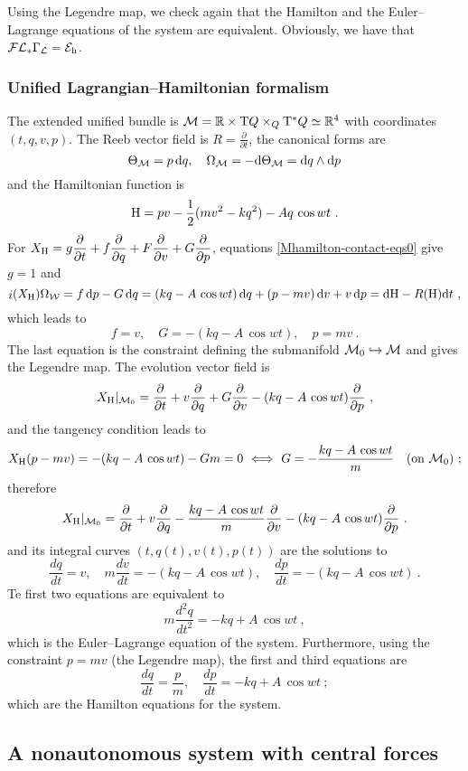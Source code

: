 \documentclass[12pt]{report}
\def\dst{\displaystyle}
\def\derpar#1#2{\frac{\partial{#1}}{\partial{#2}}}
\def\Lag{{\cal L}}
\def\d{{\rm d}}
\def\Real{\mathbb{R}}
\def\Tan{{\rm T}}
\def\inn{\mathop{i}\nolimits}
\def\Leg{{\cal F}\Lag}
\begin{document}
Using the Legendre map, we check again that the Hamilton and
the Euler--Lagrange equations of the system are equivalent.
Obviously, we have that $\Leg_*\Gamma_\Lag={\cal E}_{\rm h}$.


\subsubsection{Unified Lagrangian--Hamiltonian formalism}


The extended unified bundle is ${\cal M}=\Real\times\Tan Q\times_Q\Tan^*Q\simeq\Real^4$
with coordinates $(t,q,v,p)$. The Reeb vector field is $\dst R=\derpar{}{t}$, 
the canonical forms are
$$
\Theta_{\cal M}=p\,\d q ,\quad
\Omega_{\cal M}=-\d\Theta_{\cal M}=\d q\wedge\d p
$$
and the Hamiltonian function is
$$
{\rm H}=pv-\frac{1}{2}(mv^2-kq^2)-Aq\,\cos w t  \ .
$$
For $\displaystyle X_{\rm H}=g\derpar{}{t}+f\derpar{}{q}+F\derpar{}{v}+G\derpar{}{p}$,
equations \eqref{Mhamilton-contact-eqs0} give $g=1 $ and
$$
\inn(X_{\rm H})\Omega_{\cal W}= f\, \d p-G\, \d q=
(kq-A\,\cos w t)\, \d q+(p-mv)\,\d v+v\, \d p=\d{\rm H}-R({\rm H})\d t\ ,
$$
which leads to
$$
f=v ,\quad G=-(kq-A\,\cos w t ) ,\quad p=mv  \ .
$$
The last equation is the constraint defining the submanifold
${\cal M}_0\hookrightarrow{\cal M}$ and gives the Legendre map.
The evolution vector field is
$$
X_{\rm H}\vert_{{\cal M}_0}=\derpar{}{t}+v\derpar{}{q}+G\derpar{}{v}-
(kq-A\,\cos w t )\derpar{}{p} \ ,
$$
and the tangency condition leads to
$$
X_{\rm H}(p-mv)=-(kq-A\,\cos w t )-Gm=0 \ \Longleftrightarrow\
G=-\frac{kq-A\,\cos w t}{m} \quad \mbox{\rm (on ${\cal M}_0$)} \ ;
$$
therefore
$$
X_{\rm H}\vert_{{\cal M}_0}=\derpar{}{t}+v\derpar{}{q}
-\frac{kq-A\,\cos w t}{m}\derpar{}{v}-(kq-A\,\cos w t)\derpar{}{p} \ .
$$
and its integral curves $(t,q(t),v(t),p(t))$ are the solutions to
$$
\frac{dq}{dt}=v ,\quad
m\frac{dv}{dt}=-(kq-A\,\cos w t) ,\quad
\frac{dp}{dt}=-(kq-A\,\cos w t) \ .
$$
Te first two equations are equivalent to
$$
m\frac{d^2q}{dt^2}=-kq+A\,\cos w t \ ,
$$
which is the Euler--Lagrange equation of the system. 
Furthermore, using the constraint $p=mv$ (the Legendre map),
the first and third equations are
$$
\frac{dq}{dt}=\frac{p}{m} ,\quad
\frac{dp}{dt}=-kq+A\,\cos w t \ ;
$$
which are the Hamilton equations for the system.


\subsection{A nonautonomous system with central forces}
\end{document}
